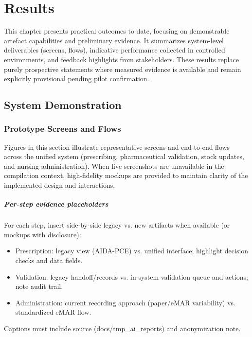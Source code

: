 \chapter{Results}
\label{chap:Results}

This chapter presents practical outcomes to date, focusing on demonstrable artefact capabilities and preliminary evidence. It summarizes system-level deliverables (screens, flows), indicative performance collected in controlled environments, and feedback highlights from stakeholders. These results replace purely prospective statements where measured evidence is available and remain explicitly provisional pending pilot confirmation.

\section{System Demonstration}

\subsection{Prototype Screens and Flows}
Figures in this section illustrate representative screens and end-to-end flows across the unified system (prescribing, pharmaceutical validation, stock updates, and nursing administration). When live screenshots are unavailable in the compilation context, high-fidelity mockups are provided to maintain clarity of the implemented design and interactions.

\paragraph{Per-step evidence placeholders}
For each step, insert side-by-side legacy vs. new artifacts when available (or mockups with disclosure):
\begin{itemize}
    \item Prescription: legacy view (AIDA-PCE) vs. unified interface; highlight decision checks and data fields.
    \item Validation: legacy handoff/records vs. in-system validation queue and actions; note audit trail.
    \item Administration: current recording approach (paper/eMAR variability) vs. standardized eMAR flow.
\end{itemize}
Captions must include source (docs/tmp\_ai\_reports) and anonymization note.


